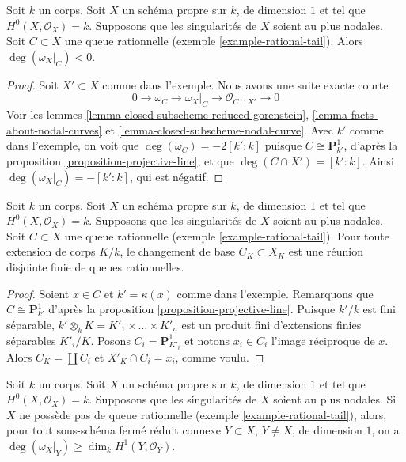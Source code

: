 \begin{lemma}
\label{lemma-rational-tail-negative}
Soit $k$ un corps. Soit $X$ un schéma propre sur $k$, de dimension $1$ et tel que $H^0(X, \mathcal{O}_X) = k$. Supposons que les singularités de $X$ soient au plus nodales. Soit $C \subset X$ une queue rationnelle (exemple \ref{example-rational-tail}). Alors $\deg(\omega_X|_C) < 0$.
\end{lemma}

\begin{proof}
Soit $X' \subset X$ comme dans l'exemple. Nous avons une suite exacte courte $$
0 \to \omega_C \to \omega_X|_C \to \mathcal{O}_{C \cap X'} \to 0
$$ Voir les lemmes \ref{lemma-closed-subscheme-reduced-gorenstein}, \ref{lemma-facts-about-nodal-curves} et \ref{lemma-closed-subscheme-nodal-curve}. Avec $k'$ comme dans l'exemple, on voit que $\deg(\omega_C) = -2[k' : k]$ puisque $C \cong \mathbf{P}^1_{k'}$, d'après la proposition \ref{proposition-projective-line}, et que $\deg(C \cap X') = [k' : k]$. Ainsi $\deg(\omega_X|_C) = -[k' : k]$, qui est négatif.
\end{proof}

\begin{lemma}
\label{lemma-rational-tail-field-extension}
Soit $k$ un corps. Soit $X$ un schéma propre sur $k$, de dimension $1$ et tel que $H^0(X, \mathcal{O}_X) = k$. Supposons que les singularités de $X$ soient au plus nodales. Soit $C \subset X$ une queue rationnelle (exemple \ref{example-rational-tail}). Pour toute extension de corps $K/k$, le changement de base $C_K \subset X_K$ est une réunion disjointe finie de queues rationnelles.
\end{lemma}

\begin{proof}
Soient $x \in C$ et $k' = \kappa(x)$ comme dans l'exemple. Remarquons que $C \cong \mathbf{P}^1_{k'}$ d'après la proposition \ref{proposition-projective-line}. Puisque $k'/k$ est fini séparable, $k' \otimes_k K = K'_1 \times \ldots \times K'_n$ est un produit fini d'extensions finies séparables $K'_i/K$. Posons $C_i = \mathbf{P}^1_{K'_i}$ et notons $x_i \in C_i$ l'image réciproque de $x$. Alors $C_K = \coprod C_i$ et $X'_K \cap C_i = x_i$, comme voulu.
\end{proof}

\begin{lemma}
\label{lemma-no-rational-tail}
Soit $k$ un corps. Soit $X$ un schéma propre sur $k$, de dimension $1$ et tel que $H^0(X, \mathcal{O}_X) = k$. Supposons que les singularités de $X$ soient au plus nodales. Si $X$ ne possède pas de queue rationnelle (exemple \ref{example-rational-tail}), alors, pour tout sous-schéma fermé réduit connexe $Y \subset X$, $Y \not = X$, de dimension $1$, on a $\deg(\omega_X|_Y) \geq \dim_k H^1(Y, \mathcal{O}_Y)$.
\end{lemma}

